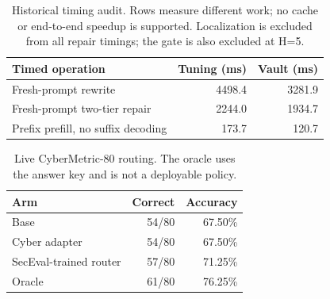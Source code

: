 \begin{table}[ht]
\centering
\caption{Historical timing audit. Rows measure different work; no cache or end-to-end speedup is supported. Localization is excluded from all repair timings; the gate is also excluded at H=5.}
\label{tab:kv-systems}
\begin{tabular}{lrr}
\toprule
Timed operation & Tuning (ms) & Vault (ms) \\
\midrule
Fresh-prompt rewrite & 4498.4 & 3281.9 \\
Fresh-prompt two-tier repair & 2244.0 & 1934.7 \\
Prefix prefill, no suffix decoding & 173.7 & 120.7 \\
\bottomrule
\end{tabular}
\end{table}

\begin{table}[ht]
\centering
\caption{Live CyberMetric-80 routing. The oracle uses the answer key and is not a deployable policy.}
\label{tab:live-routing}
\begin{tabular}{lrr}
\toprule
Arm & Correct & Accuracy \\
\midrule
Base & 54/80 & 67.50\% \\
Cyber adapter & 54/80 & 67.50\% \\
SecEval-trained router & 57/80 & 71.25\% \\
Oracle & 61/80 & 76.25\% \\
\bottomrule
\end{tabular}
\end{table}

